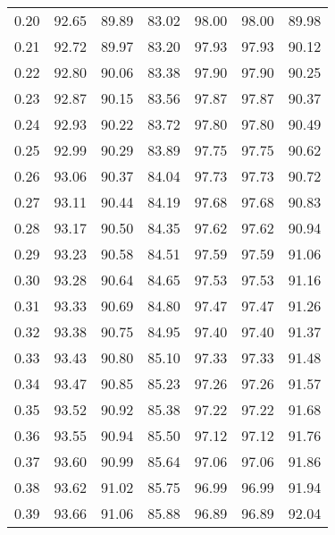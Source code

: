 \begin{tabular}{|c|c|c|c|c|c|c|}
      0.20 &     92.65 &     89.89 &      83.02 &   98.00 &      98.00 &         89.98 \\
      0.21 &     92.72 &     89.97 &      83.20 &   97.93 &      97.93 &         90.12 \\
      0.22 &     92.80 &     90.06 &      83.38 &   97.90 &      97.90 &         90.25 \\
      0.23 &     92.87 &     90.15 &      83.56 &   97.87 &      97.87 &         90.37 \\
      0.24 &     92.93 &     90.22 &      83.72 &   97.80 &      97.80 &         90.49 \\
      0.25 &     92.99 &     90.29 &      83.89 &   97.75 &      97.75 &         90.62 \\
      0.26 &     93.06 &     90.37 &      84.04 &   97.73 &      97.73 &         90.72 \\
      0.27 &     93.11 &     90.44 &      84.19 &   97.68 &      97.68 &         90.83 \\
      0.28 &     93.17 &     90.50 &      84.35 &   97.62 &      97.62 &         90.94 \\
      0.29 &     93.23 &     90.58 &      84.51 &   97.59 &      97.59 &         91.06 \\
      0.30 &     93.28 &     90.64 &      84.65 &   97.53 &      97.53 &         91.16 \\
      0.31 &     93.33 &     90.69 &      84.80 &   97.47 &      97.47 &         91.26 \\
      0.32 &     93.38 &     90.75 &      84.95 &   97.40 &      97.40 &         91.37 \\
      0.33 &     93.43 &     90.80 &      85.10 &   97.33 &      97.33 &         91.48 \\
      0.34 &     93.47 &     90.85 &      85.23 &   97.26 &      97.26 &         91.57 \\
      0.35 &     93.52 &     90.92 &      85.38 &   97.22 &      97.22 &         91.68 \\
      0.36 &     93.55 &     90.94 &      85.50 &   97.12 &      97.12 &         91.76 \\
      0.37 &     93.60 &     90.99 &      85.64 &   97.06 &      97.06 &         91.86 \\
      0.38 &     93.62 &     91.02 &      85.75 &   96.99 &      96.99 &         91.94 \\
      0.39 &     93.66 &     91.06 &      85.88 &   96.89 &      96.89 &         92.04 \\

\end{tabular}
